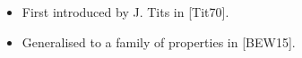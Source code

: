\documentclass[preview]{standalone}
\begin{document}
\begin{center}
\begin{itemize} \item First introduced by J. Tits in [Tit70].\item Generalised to a family of properties in [BEW15]. \end{itemize}
\end{center}
\end{document}
